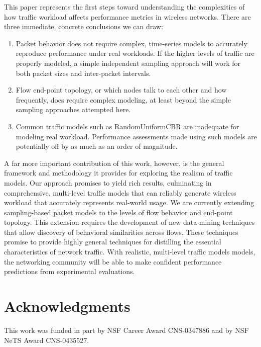 \documentclass[conference]{IEEEtran}
\newcommand{\caps}[1]{{\small{#1}}}
\begin{document}
This paper represents the first steps toward understanding the complexities of how traffic workload affects performance metrics in wireless networks. There are three immediate, concrete conclusions we can draw:
\begin{enumerate}
\item Packet behavior does not require complex, time-series models to accurately reproduce performance under real workloads. If the higher levels of traffic are properly modeled, a simple independent sampling approach will work for both packet sizes and inter-packet intervals.
\item Flow end-point topology, or which nodes talk to each other and how frequently, does require complex modeling, at least beyond the simple sampling approaches attempted here.
\item Common traffic models such as RandomUniform\caps{CBR} are inadequate for modeling real workload. Performance assessments made using such models are potentially off by as much as an order of magnitude.
\end{enumerate}
A far more important contribution of this work, however, is the general framework and methodology it provides for exploring the realism of traffic models. Our approach promises to yield rich results, culminating in comprehensive, multi-level traffic models that can reliably generate  wireless workload that accurately represents real-world usage. We are currently extending sampling-based packet models to the levels of flow behavior and end-point topology. This extension requires the development of new data-mining techniques that allow discovery of behavioral similarities across flows. These techniques promise to provide highly general techniques for distilling the essential characteristics of network traffic. With realistic, multi-level traffic models models, the networking community will be able to make confident performance predictions from experimental evaluations.

\section{Acknowledgments}
This work was funded in part by NSF Career Award CNS-0347886 and by NSF NeTS Award CNS-0435527.


\end{document}
